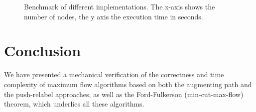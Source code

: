 \documentclass[smallcondensed]{svjour3}     %
\begin{document}
\begin{figure}[!h]
\begin{center}
\end{center}
\caption{Benchmark of different implementations. The x-axis shows the number of nodes, the y axis the execution time in seconds.}\label{fig:benchmark}
\end{figure}


% 
%   
  
% 
% 
    
    

\section{Conclusion}\label{sec:concl}
  We have presented a mechanical verification of the correctness and time complexity of maximum flow algorithms based on both 
  the augmenting path and the push-relabel approaches, as well as the Ford-Fulkerson (min-cut-max-flow) theorem, which underlies all these algorithms.
  
\end{document}
